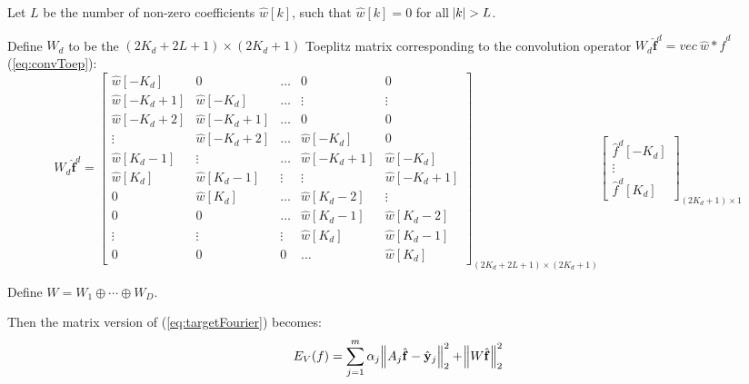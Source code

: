 \documentclass[12pt]{article}
\numberwithin{equation}{section}
\begin{document}
Let $L$ be the number of non-zero coefficients $\hat{w}[k]$, such that  $\hat{w}[k]=0$ for all $\abs{k}>L$. \par
Define $W_d$ to be the $(2K_d+2L+1) \times (2K_d+1)$ Toeplitz matrix corresponding to 
the convolution operator $W_d\hat{\bm{f}}^d=vec \ \hat{w}*\hat{f}^d$ (\ref{eq:convToep}):
\begin{equation} 
	W_d\hat{\bm{f}}^d =
	\begin{bmatrix}
                \hat{w}[-K_d]     & 0 				& \ldots & 0 			& 0 \\
                \hat{w}[-K_d+1] & \hat{w}[-K_d] 		& \ldots & \vdots 		& \vdots \\
                \hat{w}[-K_d+2] & \hat{w}[-K_d+1] 	& \ldots & 0 			& 0 \\
                \vdots 		&  \hat{w}[-K_d+2] 	& \ldots &  \hat{w}[-K_d] 	& 0 \\
                 \hat{w}[K_d-1]  & \vdots 			& \ldots &  \hat{w}[-K_d+1] &  \hat{w}[-K_d] \\
                 \hat{w}[K_d] 	&  \hat{w}[K_d-1] 	& \vdots & \vdots 		&  \hat{w}[-K_d+1] \\
                0 			&  \hat{w}[K_d]		& \ldots &  \hat{w}[K_d-2] 	& \vdots \\
                0 			& 0 				& \ldots &  \hat{w}[K_d-1]	&  \hat{w}[K_d-2] \\
                \vdots 		& \vdots 			& \vdots &  \hat{w}[K_d] 	&  \hat{w}[K_d-1]\\
                0 			& 0 				& 0 	     & \ldots 		& \hat{w}[K_d]
	\end{bmatrix}_{(2K_d+2L+1) \times (2K_d+1)}
	\begin{bmatrix}
		\hat{f}^d[-K_d] \\  \vdots \\ \hat{f}^d[K_d] 
	\end{bmatrix}_{(2K_d+1) \times 1}
\end{equation} \par
Define $W=W_1 \oplus \cdots \oplus W_D$. \par

Then the matrix version of (\ref{eq:targetFourier}) becomes:
\begin{equation} \label{eq:targetMatrix}
	E_V(f)=\sum^{m}_{j=1} \alpha_j \norm{A_j \hat{\mathbf{f}}-\hat{\mathbf{y}}_j}^2_{2}
		 + \norm{W  \hat{\mathbf{f}}}^2_{2}
\end{equation} \par

\end{document}
